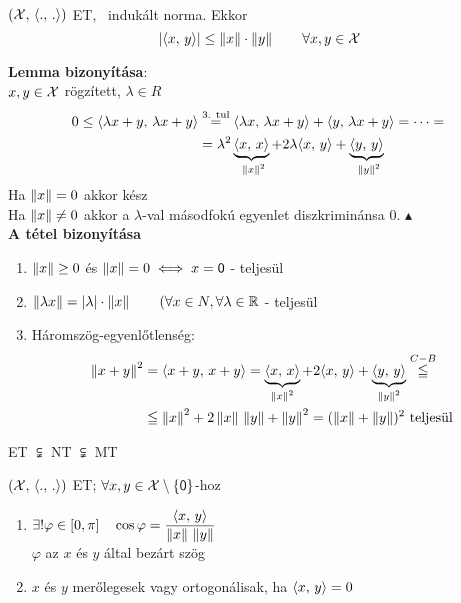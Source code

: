 \begin{biz}
  \begin{lemma}\ \\
    $(\mathcal{X},\,\langle.,\,.\rangle)$ ET, \Norma\ indukált norma. Ekkor
    \[\left|\langle x,\,y\rangle\right| \leq \left\Vert x\right\Vert\cdot\left\Vert y\right\Vert\qquad \forall x,y\in\mathcal{X}\] 
  \end{lemma}
  \textbf{Lemma bizonyítása}:\\
  $x,y\in\mathcal{X}$ rögzített, $\lambda \in R$
  \[
  \begin{split}
    0 \leq \langle\lambda x+y,\,\lambda x+y\rangle &\overset{\text{3. tul}}=
    \langle\lambda x,\,\lambda x +y\rangle + \langle y,\,\lambda x +y\rangle = \dotsb ={}\\
    &=  \lambda^2 \underbrace{\langle x,\, x\rangle}_{\ \left\Vert x\right\Vert^2} + 2\lambda\langle x,\,y\rangle +
    \underbrace{\langle y,\,y\rangle}_{\ \left\Vert y\right\Vert^2}
  \end{split}
  \]
  Ha $\left\Vert x\right\Vert = 0$ akkor kész\\
  Ha $\left\Vert x\right\Vert \ne 0$ akkor a $\lambda$-val másodfokú egyenlet diszkriminánsa 0. \hfill$\blacktriangle$\\

  \textbf{A tétel bizonyítása}
  \begin{enumerate}[\qquad(i)]
  \item $\left\Vert x\right\Vert \geq 0$ és $\left\Vert x\right\Vert =0 \iff x = \mathsf{0}$ - teljesül
  \item $\left\Vert \lambda x\right\Vert = |\lambda| \cdot \left\Vert x\right\Vert\qquad(\forall x \in N, \forall \lambda\in \mathbb{R}$ - teljesül
  \item Háromszög-egyenlőtlenség:\\
    \[ \begin{split}
      \left\Vert x+y\right\Vert^2 &= \langle x+y,\,x+y\rangle = \underbrace{\langle x,\,x\rangle}_{\left\Vert x\right\Vert^2} + 2\langle x,\,y\rangle + \underbrace{
	\langle y,\,y\rangle}_{\left\Vert y\right\Vert^2} \overset{C-B}{\leqq} {}\\
      & \leqq \left\Vert x\right\Vert^2 + 2\left\Vert x\right\Vert\,\left\Vert y\right\Vert + \left\Vert y\right\Vert^2 = (\left\Vert x\right\Vert+\left\Vert y\right\Vert)^2 \text { teljesül}
    \end{split} \]
  \end{enumerate}     
\end{biz}

\begin{megj}
  ET $\subsetneqq$ NT $\subsetneqq$ MT
\end{megj}
\newpage
\begin{de} $(\mathcal{X},\,\langle.,\,.\rangle)$ ET;  $\forall x,y\in \mathcal{X}\setminus\left\{\mathsf{0}\right\}$-hoz
  \begin{enumerate}
  \item $\exists!\varphi\in[0,\pi]\quad \cos\varphi=\dfrac{\langle x,\,y\rangle}{\left\Vert x\right\Vert\,\left\Vert y\right\Vert}$\\
    $\varphi$ az $x$ és $y$ által bezárt szög
  \item $x$ és $y$ merőlegesek vagy ortogonálisak, ha $\langle x,\,y\rangle =0$       
  \end{enumerate}
\end{de}

